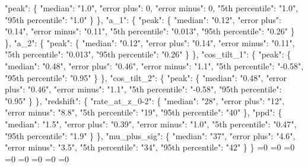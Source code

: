 {{        "peak": \{%
          "median": "1.0", %
          "error plus": 0, %
          "error minus": 0, %
          "5th percentile": "1.0", %
          "95th percentile": "1.0"%
        \}%
      \}, %
      "a\_1": \{%
        "peak": \{%
          "median": "0.12", %
          "error plus": "0.14", %
          "error minus": "0.11", %
          "5th percentile": "0.013", %
          "95th percentile": "0.26"%
        \}%
      \}, %
      "a\_2": \{%
        "peak": \{%
          "median": "0.12", %
          "error plus": "0.14", %
          "error minus": "0.11", %
          "5th percentile": "0.013", %
          "95th percentile": "0.26"%
        \}%
      \}, %
      "cos\_tilt\_1": \{%
        "peak": \{%
          "median": "0.48", %
          "error plus": "0.46", %
          "error minus": "1.1", %
          "5th percentile": "{-}0.58", %
          "95th percentile": "0.95"%
        \}%
      \}, %
      "cos\_tilt\_2": \{%
        "peak": \{%
          "median": "0.48", %
          "error plus": "0.46", %
          "error minus": "1.1", %
          "5th percentile": "{-}0.58", %
          "95th percentile": "0.95"%
        \}%
      \}, %
      "redshift": \{%
        "rate\_at\_z\_0{-}2": \{%
          "median": "28", %
          "error plus": "12", %
          "error minus": "8.8", %
          "5th percentile": "19", %
          "95th percentile": "40"%
        \}, %
        "ppd": \{%
          "median": "1.5", %
          "error plus": "0.39", %
          "error minus": "1.0", %
          "5th percentile": "0.47", %
          "95th percentile": "1.9"%
        \}%
      \}, %
      "mu\_plus\_sig": \{%
        "median": "37", %
        "error plus": "4.6", %
        "error minus": "3.5", %
        "5th percentile": "34", %
        "95th percentile": "42"%
      \}%
    \}}%
  \else%
    \ifnum{}=0%
      \let\defaultbbhgwtcthree@out\defaultbbhgwtcthree@I%
    \else%
      \ifnum{}=0%
      \let\defaultbbhgwtcthree@out\defaultbbhgwtcthree@II%
    \else%
      \ifnum{}=0%
      \let\defaultbbhgwtcthree@out\defaultbbhgwtcthree@III%
    \else%
      \ifnum{}=0%
      \let\defaultbbhgwtcthree@out\defaultbbhgwtcthree@IV%
    \else%
      \ifnum{}=0%
      \let\defaultbbhgwtcthree@out\defaultbbhgwtcthree@V%
    \else%
      \ifnum{}=0%
      \let\defaultbbhgwtcthree@out\defaultbbhgwtcthree@VI%
    \else%
      \ifnum{}=0%
      \let\defaultbbhgwtcthree@out\defaultbbhgwtcthree@VII%
    \else%
      \ifnum{}=0%
}
